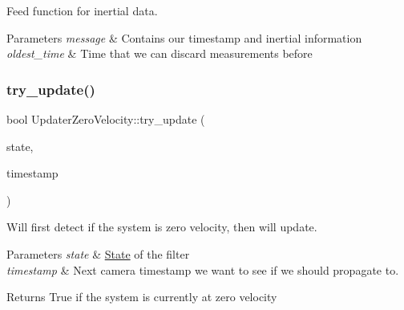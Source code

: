 Feed function for inertial data. 


\begin{DoxyParams}{Parameters}
{\em message} & Contains our timestamp and inertial information \\
\hline
{\em oldest\+\_\+time} & Time that we can discard measurements before \\
\hline
\end{DoxyParams}
\mbox{\label{classov__msckf_1_1UpdaterZeroVelocity_a703a198829da68f905280ce8af8aa9e6}} 
\subsubsection{\texorpdfstring{try\+\_\+update()}{try\_update()}}
{\footnotesize\ttfamily bool Updater\+Zero\+Velocity\+::try\+\_\+update (\begin{DoxyParamCaption}\item[{std\+::shared\+\_\+ptr$<$ \hyperlink{classov__msckf_1_1State}{State} $>$}]{state,  }\item[{double}]{timestamp }\end{DoxyParamCaption})}



Will first detect if the system is zero velocity, then will update. 


\begin{DoxyParams}{Parameters}
{\em state} & \hyperlink{classov__msckf_1_1State}{State} of the filter \\
\hline
{\em timestamp} & Next camera timestamp we want to see if we should propagate to. \\
\hline
\end{DoxyParams}
\begin{DoxyReturn}{Returns}
True if the system is currently at zero velocity 
\end{DoxyReturn}
